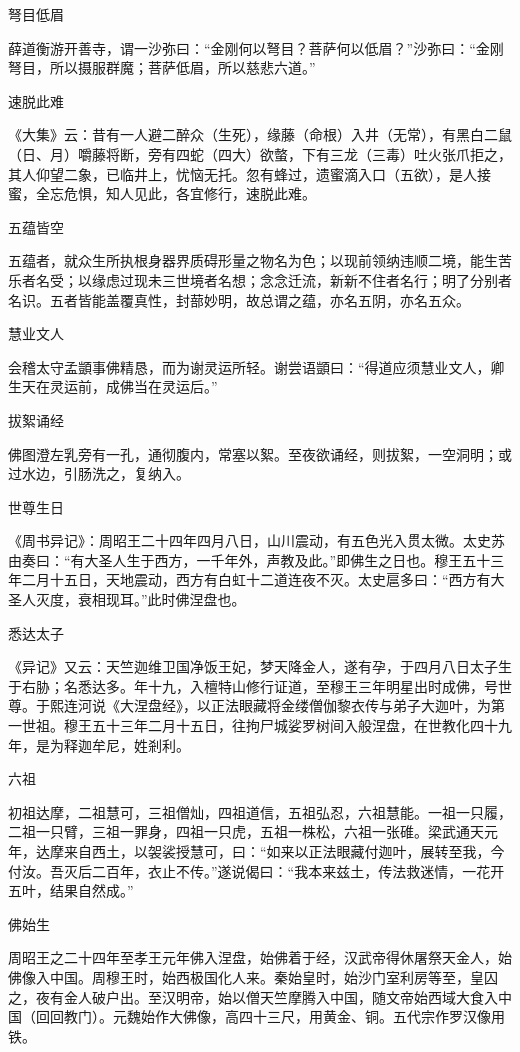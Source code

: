 \documentclass[a4paper,12pt,UTF8,twoside]{ctexbook}
\begin{document}
    弩目低眉
    
    薛道衡游开善寺，谓一沙弥曰：“金刚何以弩目？菩萨何以低眉？”沙弥曰：“金刚弩目，所以摄服群魔；菩萨低眉，所以慈悲六道。”
    
    速脱此难
    
    《大集》云：昔有一人避二醉众（生死），缘藤（命根）入井（无常），有黑白二鼠（日、月）嚼藤将断，旁有四蛇（四大）欲螫，下有三龙（三毒）吐火张爪拒之，其人仰望二象，已临井上，忧恼无托。忽有蜂过，遗蜜滴入口（五欲），是人接蜜，全忘危惧，知人见此，各宜修行，速脱此难。
    
    五蕴皆空
    
    五蕴者，就众生所执根身器界质碍形量之物名为色；以现前领纳违顺二境，能生苦乐者名受；以缘虑过现未三世境者名想；念念迁流，新新不住者名行；明了分别者名识。五者皆能盖覆真性，封蔀妙明，故总谓之蕴，亦名五阴，亦名五众。
    
    慧业文人
    
    会稽太守孟顗事佛精恳，而为谢灵运所轻。谢尝语顗曰：“得道应须慧业文人，卿生天在灵运前，成佛当在灵运后。”
    
    拔絮诵经
    
    佛图澄左乳旁有一孔，通彻腹内，常塞以絮。至夜欲诵经，则拔絮，一空洞明；或过水边，引肠洗之，复纳入。
    
    世尊生日
    
    《周书异记》：周昭王二十四年四月八日，山川震动，有五色光入贯太微。太史苏由奏曰：“有大圣人生于西方，一千年外，声教及此。”即佛生之日也。穆王五十三年二月十五日，天地震动，西方有白虹十二道连夜不灭。太史扈多曰：“西方有大圣人灭度，衰相现耳。”此时佛涅盘也。
    
    悉达太子
    
    《异记》又云：天竺迦维卫国净饭王妃，梦天降金人，遂有孕，于四月八日太子生于右胁；名悉达多。年十九，入檀特山修行证道，至穆王三年明星出时成佛，号世尊。于熙连河说《大涅盘经》，以正法眼藏将金缕僧伽黎衣传与弟子大迦叶，为第一世祖。穆王五十三年二月十五日，往拘尸城娑罗树间入般涅盘，在世教化四十九年，是为释迦牟尼，姓剎利。
    
    六祖
    
    初祖达摩，二祖慧可，三祖僧灿，四祖道信，五祖弘忍，六祖慧能。一祖一只履，二祖一只臂，三祖一罪身，四祖一只虎，五祖一株松，六祖一张碓。梁武通天元年，达摩来自西土，以袈裟授慧可，曰：“如来以正法眼藏付迦叶，展转至我，今付汝。吾灭后二百年，衣止不传。”遂说偈曰：“我本来兹土，传法救迷情，一花开五叶，结果自然成。”
    
    佛始生
    
    周昭王之二十四年至孝王元年佛入涅盘，始佛着于经，汉武帝得休屠祭天金人，始佛像入中国。周穆王时，始西极国化人来。秦始皇时，始沙门室利房等至，皇囚之，夜有金人破户出。至汉明帝，始以僧天竺摩腾入中国，随文帝始西域大食入中国（回回教门）。元魏始作大佛像，高四十三尺，用黄金、铜。五代宗作罗汉像用铁。
    
\end{document}
